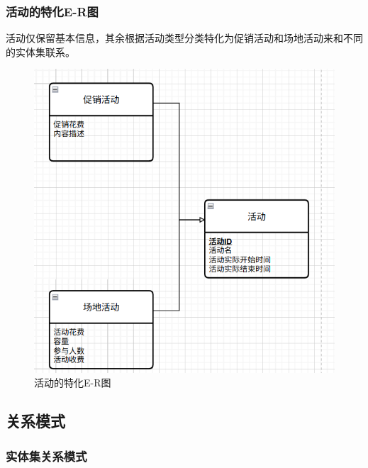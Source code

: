 \documentclass[]{article}
\let\oldincludegraphics\includegraphics
\renewcommand{\includegraphics}[2][]{%
  \begin{center}\oldincludegraphics[#1]{#2}\end{center}%
}
\begin{document}
\hypertarget{ux6d3bux52a8ux7684ux7279ux5316e-rux56fe}{%
\subsubsection{活动的特化E-R图}\label{ux6d3bux52a8ux7684ux7279ux5316e-rux56fe}}

活动仅保留基本信息，其余根据活动类型分类特化为促销活动和场地活动来和不同的实体集联系。

\begin{figure}[htbp]
\centering
\includegraphics{image14.png}
\caption{活动的特化E-R图}
\end{figure}

\hypertarget{ux5173ux7cfbux6a21ux5f0f}{%
\subsection{关系模式}\label{ux5173ux7cfbux6a21ux5f0f}}

\hypertarget{ux5b9eux4f53ux96c6ux5173ux7cfbux6a21ux5f0f}{%
\subsubsection{实体集关系模式}\label{ux5b9eux4f53ux96c6ux5173ux7cfbux6a21ux5f0f}}
\end{document}
